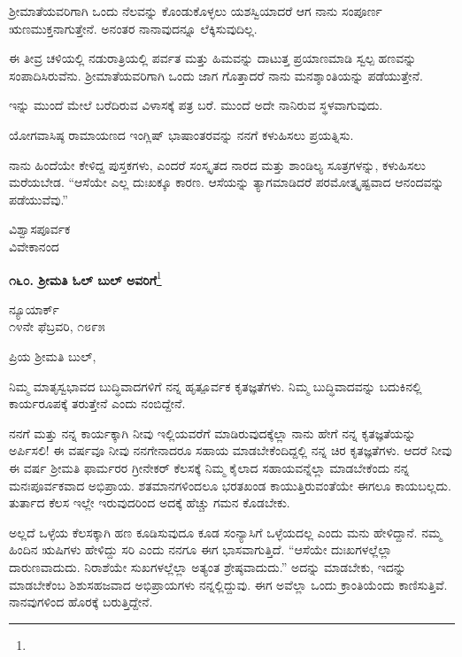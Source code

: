 ಶ‍್ರೀಮಾತೆಯವರಿಗಾಗಿ ಒಂದು ನೆಲವನ್ನು ಕೊಂಡುಕೊಳ್ಳಲು ಯಶಸ್ವಿಯಾದರೆ ಆಗ ನಾನು ಸಂಪೂರ್ಣ ಋಣಮುಕ್ತನಾಗುತ್ತೇನೆ. ಅನಂತರ ನಾನಾವುದನ್ನೂ ಲೆಕ್ಕಿಸುವುದಿಲ್ಲ.
\vspace{0.3cm}

ಈ ತೀವ್ರ ಚಳಿಯಲ್ಲಿ ನಡುರಾತ್ರಿಯಲ್ಲಿ ಪರ್ವತ ಮತ್ತು ಹಿಮವನ್ನು ದಾಟುತ್ತ ಪ್ರಯಾಣಮಾಡಿ ಸ್ವಲ್ಪ ಹಣವನ್ನು ಸಂಪಾದಿಸಿರುವೆನು. ಶ‍್ರೀಮಾತೆಯವರಿಗಾಗಿ ಒಂದು ಜಾಗ ಗೊತ್ತಾದರೆ ನಾನು ಮನಶ್ಶಾಂತಿಯನ್ನು ಪಡೆಯುತ್ತೇನೆ.
\vspace{0.3cm}

ಇನ್ನು ಮುಂದೆ ಮೇಲೆ ಬರೆದಿರುವ ವಿಳಾಸಕ್ಕೆ ಪತ್ರ ಬರೆ. ಮುಂದೆ ಅದೇ ನಾನಿರುವ ಸ್ಥಳವಾಗುವುದು.
\vspace{0.3cm}

ಯೋಗವಾಸಿಷ್ಠ ರಾಮಾಯಣದ ಇಂಗ್ಲಿಷ್ ಭಾಷಾಂತರವನ್ನು ನನಗೆ ಕಳುಹಿಸಲು ಪ್ರಯತ್ನಿಸು.

ನಾನು ಹಿಂದೆಯೇ ಕೇಳಿದ್ದ ಪುಸ್ತಕಗಳು, ಎಂದರೆ ಸಂಸ್ಕೃತದ ನಾರದ ಮತ್ತು ಶಾಂಡಿಲ್ಯ ಸೂತ್ರಗಳನ್ನು, ಕಳುಹಿಸಲು ಮರೆಯಬೇಡ. “ಆಸೆಯೇ ಎಲ್ಲ ದುಃಖಕ್ಕೂ ಕಾರಣ. ಆಸೆಯನ್ನು ತ್ಯಾಗಮಾಡಿದರೆ ಪರಮೋತ್ಕೃಷ್ಟವಾದ ಆನಂದವನ್ನು ಪಡೆಯುವೆವು.”

\vspace{-0.3cm}

{\flushright
ವಿಶ್ವಾಸಪೂರ್ವಕ\\ವಿವೇಕಾನಂದ\par}

\begin{center}
\textbf{೧೬೦. ಶ‍್ರೀಮತಿ ಓಲ್ ಬುಲ್ ಅವರಿಗೆ}\footnote{}
\end{center}

\vspace{-0.6cm}

\begin{flushright}
ನ್ಯೂಯಾರ್ಕ್\\೧೪ನೇ ಫೆಬ್ರವರಿ, ೧೮೯೫
\end{flushright}

\vspace{-0.3cm}

\noindent
ಪ್ರಿಯ ಶ‍್ರೀಮತಿ ಬುಲ್,

ನಿಮ್ಮ ಮಾತೃಸ್ವಭಾವದ ಬುದ್ಧಿವಾದಗಳಿಗೆ ನನ್ನ ಹೃತ್ಪೂರ್ವಕ ಕೃತಜ್ಞತೆಗಳು. ನಿಮ್ಮ ಬುದ್ಧಿವಾದವನ್ನು ಬದುಕಿನಲ್ಲಿ ಕಾರ್ಯರೂಪಕ್ಕೆ ತರುತ್ತೇನೆ ಎಂದು ನಂಬಿದ್ದೇನೆ.

ನನಗೆ ಮತ್ತು ನನ್ನ ಕಾರ್ಯಕ್ಕಾಗಿ ನೀವು ಇಲ್ಲಿಯವರೆಗೆ ಮಾಡಿರುವುದಕ್ಕೆಲ್ಲಾ ನಾನು ಹೇಗೆ ನನ್ನ ಕೃತಜ್ಞತೆಯನ್ನು ಅರ್ಪಿಸಲಿ! ಈ ವರ್ಷವೂ ನೀವು ನನಗೇನಾದರೂ ಸಹಾಯ ಮಾಡಬೇಕೆಂದಿದ್ದಲ್ಲಿ ನನ್ನ ಚಿರ ಕೃತಜ್ಞತೆಗಳು. ಆದರೆ ನೀವು ಈ ವರ್ಷ ಶ‍್ರೀಮತಿ ಫಾರ್ಮರರ ಗ್ರೀನೇಕರ್ ಕೆಲಸಕ್ಕೆ ನಿಮ್ಮ ಕೈಲಾದ ಸಹಾಯವನ್ನೆಲ್ಲಾ ಮಾಡಬೇಕೆಂದು ನನ್ನ ಮನಃಪೂರ್ವಕವಾದ ಅಭಿಪ್ರಾಯ. ಶತಮಾನಗಳಿಂದಲೂ ಭರತಖಂಡ ಕಾಯುತ್ತಿರುವಂತೆಯೇ ಈಗಲೂ ಕಾಯಬಲ್ಲದು. ತುರ್ತಾದ ಕೆಲಸ ಇಲ್ಲೇ ಇರುವುದರಿಂದ ಅದಕ್ಕೆ ಹೆಚ್ಚು ಗಮನ ಕೊಡಬೇಕು.

ಅಲ್ಲದೆ ಒಳ್ಳೆಯ ಕೆಲಸಕ್ಕಾಗಿ ಹಣ ಕೂಡಿಸುವುದೂ ಕೂಡ ಸಂನ್ಯಾಸಿಗೆ ಒಳ್ಳೆಯದಲ್ಲ ಎಂದು ಮನು ಹೇಳಿದ್ದಾನೆ. ನಮ್ಮ ಹಿಂದಿನ ಋಷಿಗಳು ಹೇಳಿದ್ದು ಸರಿ ಎಂದು ನನಗೂ ಈಗ ಭಾಸವಾಗುತ್ತಿದೆ. “ಆಸೆಯೇ ದುಃಖಗಳಲ್ಲೆಲ್ಲಾ ದಾರುಣವಾದುದು. ನಿರಾಶೆಯೇ ಸುಖಗಳಲ್ಲೆಲ್ಲಾ ಅತ್ಯಂತ ಶ್ರೇಷ್ಠವಾದುದು.” ಅದನ್ನು ಮಾಡಬೇಕು, ಇದನ್ನು ಮಾಡಬೇಕೆಂಬ ಶಿಶುಸಹಜವಾದ ಅಭಿಪ್ರಾಯಗಳು ನನ್ನಲ್ಲಿದ್ದುವು. ಈಗ ಅವೆಲ್ಲಾ ಒಂದು ಕ್ರಾಂತಿಯೆಂದು ಕಾಣಿಸುತ್ತಿವೆ. ನಾನವುಗಳಿಂದ ಹೊರಕ್ಕೆ ಬರುತ್ತಿದ್ದೇನೆ.

